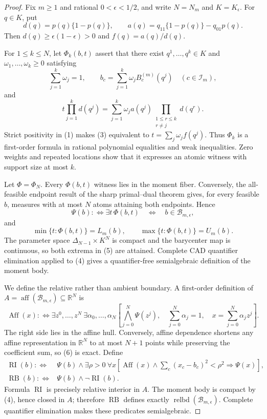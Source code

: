 \documentclass{article}
\begin{document}
\begin{proof}
Fix \(m\geq1\) and rational \(0<\epsilon<1/2\), and write \(N=N_m\) and \(K=K_{\epsilon}\).  For \(q\in K\), put
\[
 d(q)=p(q)\{1-p(q)\},
 \qquad a(q)=q_{11}\{1-p(q)\}-q_{01}p(q).
\tag{1}
\]
Then \(d(q)\geq\epsilon(1-\epsilon)>0\) and \(f(q)=a(q)/d(q)\).

For \(1\leq k\leq N\), let \(\Phi_k(b,t)\) assert that there exist \(q^1,\ldots,q^k\in K\) and \(\omega_1,\ldots,\omega_k\geq0\) satisfying
\[
 \sum_{j=1}^k\omega_j=1,
 \qquad
 b_c=\sum_{j=1}^k\omega_jB_c^{(m)}(q^j)
 \quad(c\in\mathcal I_m),
\tag{2}
\]
and
\[
 t\prod_{j=1}^kd(q^j)
 =\sum_{j=1}^k\omega_ja(q^j)
 \prod_{\substack{1\leq r\leq k\\r\neq j}}d(q^r).
\tag{3}
\]
Strict positivity in (1) makes (3) equivalent to \(t=\sum_j\omega_jf(q^j)\).  Thus \(\Phi_k\) is a first-order formula in rational polynomial equalities and weak inequalities.  Zero weights and repeated locations show that it expresses an atomic witness with support size at most \(k\).

Let \(\Phi=\Phi_N\).  Every \(\Phi(b,t)\) witness lies in the moment fiber.  Conversely, the all-feasible endpoint result of the sharp primal--dual theorem gives, for every feasible \(b\), measures with at most \(N\) atoms attaining both endpoints.  Hence
\[
 \Psi(b):\Longleftrightarrow\exists t\,\Phi(b,t)
 \quad\Longleftrightarrow\quad b\in\mathcal B_{m,\epsilon},
\tag{4}
\]
and
\[
 \min\{t:\Phi(b,t)\}=L_m(b),
 \qquad
 \max\{t:\Phi(b,t)\}=U_m(b).
\tag{5}
\]
The parameter space \(\Delta_{N-1}\times K^N\) is compact and the barycenter map is continuous, so both extrema in (5) are attained.  Complete CAD quantifier elimination applied to (4) gives a quantifier-free semialgebraic definition of the moment body.

We define the relative rather than ambient boundary.  A first-order definition of \(A=\operatorname{aff}(\mathcal B_{m,\epsilon})\subseteq\mathbb R^N\) is
\[
 \operatorname{Aff}(x):\Longleftrightarrow
 \exists z^0,\ldots,z^N\ \exists\alpha_0,\ldots,\alpha_N
 \left[
 \bigwedge_{j=0}^N\Psi(z^j),\quad
 \sum_{j=0}^N\alpha_j=1,\quad
 x=\sum_{j=0}^N\alpha_jz^j
 \right].
\tag{6}
\]
The right side lies in the affine hull.  Conversely, affine dependence shortens any affine representation in \(\mathbb R^N\) to at most \(N+1\) points while preserving the coefficient sum, so (6) is exact.  Define
\[
 \begin{split}
 \operatorname{RI}(b):\Longleftrightarrow{}&\Psi(b)\wedge
 \exists\rho>0\ \forall x\left[
 \operatorname{Aff}(x)\wedge\sum_c(x_c-b_c)^2<\rho^2
 \Rightarrow\Psi(x)\right],\\
 \operatorname{RB}(b):\Longleftrightarrow{}&\Psi(b)\wedge\neg\operatorname{RI}(b).
 \end{split}
\tag{7}
\]
Formula \(\operatorname{RI}\) is precisely relative interior in \(A\).  The moment body is compact by (4), hence closed in \(A\); therefore \(\operatorname{RB}\) defines exactly \(\operatorname{relbd}(\mathcal B_{m,\epsilon})\).  Complete quantifier elimination makes these predicates semialgebraic.


\end{proof}
\end{document}
